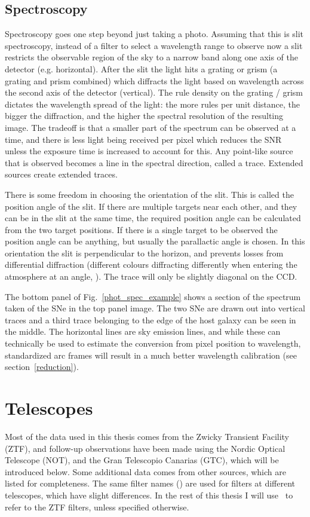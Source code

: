 \documentclass[a4paper,oneside,12pt, class=Latex/Classes/PhDthesisPSnPDF, crop=false]{standalone}
\begin{document}
\subsection{Spectroscopy}
Spectroscopy goes one step beyond just taking a photo. Assuming that this is slit spectroscopy, instead of a filter to select a wavelength range to observe now a slit restricts the observable region of the sky to a narrow band along one axis of the detector (e.g. horizontal). After the slit the light hits a grating or grism (a grating and prism combined) which diffracts the light based on wavelength across the second axis of the detector (vertical). The rule density on the grating / grism dictates the wavelength spread of the light: the more rules per unit distance, the bigger the diffraction, and the higher the spectral resolution of the resulting image. The tradeoff is that a smaller part of the spectrum can be observed at a time, and there is less light being received per pixel which reduces the SNR unless the exposure time is increased to account for this. Any point-like source that is observed becomes a line in the spectral direction, called a trace. Extended sources create extended traces.

There is some freedom in choosing the orientation of the slit. This is called the position angle of the slit. If there are multiple targets near each other, and they can be in the slit at the same time, the required position angle can be calculated from the two target positions. If there is a single target to be observed the position angle can be anything, but usually the parallactic angle is chosen. In this orientation the slit is perpendicular to the horizon, and prevents losses from differential diffraction (different colours diffracting differently when entering the atmosphere at an angle, \citealt{diff_refrac_atmosphere}). The trace will only be slightly diagonal on the CCD.

The bottom panel of Fig.~\ref{phot_spec_example} shows a section of the spectrum taken of the SNe in the top panel image. The two SNe are drawn out into vertical traces and a third trace belonging to the edge of the host galaxy can be seen in the middle. The horizontal lines are sky emission lines, and while these can technically be used to estimate the conversion from pixel position to wavelength, standardized arc frames will result in a much better wavelength calibration (see section~\ref{reduction}).


\section{Telescopes}
\label{telescopes}
Most of the data used in this thesis comes from the Zwicky Transient Facility (ZTF), and follow-up observations have been made using the Nordic Optical Telescope (NOT), and the Gran Telescopio Canarias (GTC), which will be introduced below. Some additional data comes from other sources, which are listed for completeness. The same filter names (\ztfg\ztfr\ztfi) are used for filters at different telescopes,  which have slight differences. In the rest of this thesis I will use \ztfg\ztfr\ztfi\ to refer to the ZTF filters, unless specified otherwise.
\end{document}
